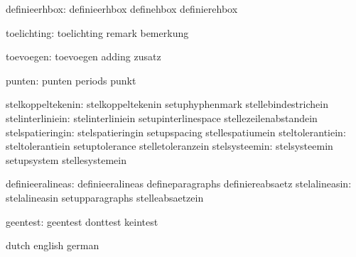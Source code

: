                 definieerhbox:  definieerhbox                definehbox
                                definierehbox

                  toelichting:  toelichting                  remark
                                bemerkung

                    toevoegen:  toevoegen                    adding
                                zusatz

                       punten:  punten                       periods
                                punkt

            stelkoppeltekenin:  stelkoppeltekenin            setuphyphenmark
                                stellebindestrichein
             stelinterliniein:  stelinterliniein             setupinterlinespace
                                stellezeilenabstandein
             stelspatieringin:  stelspatieringin             setupspacing
                                stellespatiumein
             steltolerantiein:  steltolerantiein             setuptolerance
                                stelletoleranzein
                stelsysteemin:  stelsysteemin                setupsystem
                                stellesystemein

             definieeralineas:  definieeralineas             defineparagraphs
                                definiereabsaetz
                stelalineasin:  stelalineasin                setupparagraphs
                                stelleabsaetzein

                     geentest:  geentest                     donttest
                                keintest

\stopcommands




\startcommands                  dutch                        english
                                german


